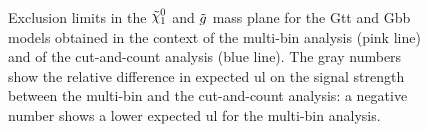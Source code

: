 \begin{figure}[htbp]
	\centering 
	\caption{Exclusion limits in the $\ninoone$ and $\tilde{g}$ mass plane
  		for the  Gtt and   Gbb models obtained
		in the context of the multi-bin analysis (pink line) and of the cut-and-count analysis (blue line). 
		The gray numbers show the relative difference in expected \gls{ul} on the signal strength 
		between the multi-bin and the cut-and-count analysis: a negative number shows a lower expected \gls{ul} for the multi-bin analysis. }
	\label{fig:limits_GbbGtt_comp}
\end{figure}

